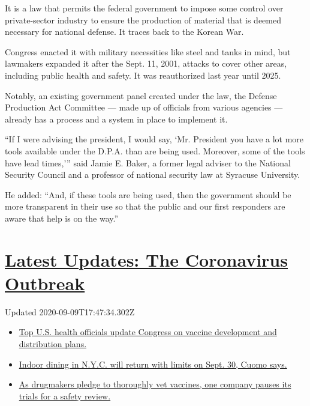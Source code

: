 It is a law that permits the federal government to impose some control
over private-sector industry to ensure the production of material that
is deemed necessary for national defense. It traces back to the Korean
War.

Congress enacted it with military necessities like steel and tanks in
mind, but lawmakers expanded it after the Sept. 11, 2001, attacks to
cover other areas, including public health and safety. It was
reauthorized last year until 2025.

Notably, an existing government panel created under the law, the Defense
Production Act Committee --- made up of officials from various agencies
--- already has a process and a system in place to implement it.

``If I were advising the president, I would say, `Mr. President you have
a lot more tools available under the D.P.A. than are being used.
Moreover, some of the tools have lead times,''' said Jamie E. Baker, a
former legal adviser to the National Security Council and a professor of
national security law at Syracuse University.

He added: ``And, if these tools are being used, then the government
should be more transparent in their use so that the public and our first
responders are aware that help is on the way.''

\hypertarget{latest-updates-the-coronavirus-outbreak}{%
\section{\texorpdfstring{\href{https://www.nytimes3xbfgragh.onion/2020/09/09/world/covid-19-coronavirus.html?action=click\&pgtype=Article\&state=default\&region=MAIN_CONTENT_1\&context=storylines_live_updates}{Latest
Updates: The Coronavirus
Outbreak}}{Latest Updates: The Coronavirus Outbreak}}\label{latest-updates-the-coronavirus-outbreak}}

Updated 2020-09-09T17:47:34.302Z

\begin{itemize}
\tightlist
\item
  \href{https://www.nytimes3xbfgragh.onion/2020/09/09/world/covid-19-coronavirus.html?action=click\&pgtype=Article\&state=default\&region=MAIN_CONTENT_1\&context=storylines_live_updates\#link-279e24e2}{Top
  U.S. health officials update Congress on vaccine development and
  distribution plans.}
\item
  \href{https://www.nytimes3xbfgragh.onion/2020/09/09/world/covid-19-coronavirus.html?action=click\&pgtype=Article\&state=default\&region=MAIN_CONTENT_1\&context=storylines_live_updates\#link-792ae257}{Indoor
  dining in N.Y.C. will return with limits on Sept. 30, Cuomo says.}
\item
  \href{https://www.nytimes3xbfgragh.onion/2020/09/09/world/covid-19-coronavirus.html?action=click\&pgtype=Article\&state=default\&region=MAIN_CONTENT_1\&context=storylines_live_updates\#link-5b0bf0d1}{As
  drugmakers pledge to thoroughly vet vaccines, one company pauses its
  trials for a safety review.}
\end{itemize}

